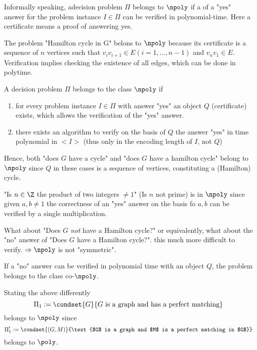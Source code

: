 Informally speaking, adecision problem $\Pi$ belongs to $\npoly$ if a  of a "yes" answer for the problem instance $I \in \Pi$ can be verified in polynomial-time. Here a certificate means a proof of answering yes.

\begin{xmp+}
The problem "Hamilton cycle in G" belons to $\npoly$ because its certificate is a sequence of $n$ vertices such that $v_i v_{i+1} \in E (i=1, \dots, n-1)$ and $v_n v_1 \in E$. Verification implies checking the existence of all edges, which can be done in polytime.
\end{xmp+}

\begin{defn}
A decision problem $\Pi$ belongs to the class $\npoly$ if
\begin{enumerate}
\item for every problem instance $I \in \Pi$ with answer "yes" an object $Q$ (certificate) exists, which allows the verification of the "yes" answer.
\item there exists an algorithm to verify on the basis of $Q$ the answer "yes" in time polynomial in $<I>$ (thus only in the encoding length of $I$, not $Q$)
\end{enumerate}

Hence, both "does $G$ have a cycle" and "does $G$ have a hamilton cycle" belong to $\npoly$ since $Q$ in these cases is a sequence of vertices, constituting a (Hamilton) cycle.
\end{defn}

\begin{xmp+}
"Is $n \in \Z$ the product of two integers $\neq 1$" (Is $n$ not prime) is in $\npoly$ since given $a,b \neq 1$ the correctness of an "yes" answer on the basis fo $a,b$ can be verified by a single multiplication.
\end{xmp+}

What about "Does $G$ \emph{not} have a Hamilton cycle?" or equivalently, what about the "no" answer of "Does $G$ have a Hamilton cycle?". this much more difficult to verify. $\Rightarrow \npoly$ is not "symmetric".

If a "no" answer can be verified in polynomial time with an object $Q$, the problem belongs to the class co-$\npoly$.

Stating the above differently 
\[
	\Pi_1:=\condset{G}{G \text{ is a graph and has a perfect matching}}
\]
belongs to $\npoly$ since
\[
	\Pi_1':=\condset{(G,M)}{\text{$G$ is a graph and $M$ is a perfect matching in $G$}}
\]
belongs to $\poly$.

